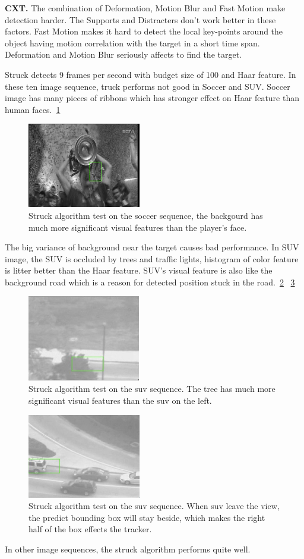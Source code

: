 \documentclass{acm_proc_article-sp}
\begin{document}
\textbf{CXT.} The combination of Deformation, Motion Blur and Fast Motion make detection harder. The Supports and Distracters don't work better in these factors. Fast Motion makes it hard to detect the local key-points around the object having motion correlation with the target in a short time span. Deformation and Motion Blur seriously affects to find the target.

Struck detects 9 frames per second with budget size of 100 and Haar feature.
In these ten image sequence, truck performs not good in Soccer and SUV.
Soccer image has many pieces of ribbons which has stronger effect on Haar feature than human faces.~\ref{fig:struck_soccer}
\begin{figure}[hbt]
    \includegraphics[width=140pt]{struck_soccer}
    \caption{Struck algorithm test on the soccer sequence, the backgourd has much more significant visual features than the player's face.}
    \label{fig:struck_soccer}
\end{figure}
The big variance of background near the target causes bad performance.
In SUV image, the SUV is occluded by trees and traffic lights, histogram of color feature is litter better than the Haar feature.
SUV's visual feature is also like the background road which is a reason for detected position stuck in the road.~\ref{fig:struck_suv} ~\ref{fig:struck_suv_out_of_view}
\begin{figure}[hbt]
    \includegraphics[width=140pt]{struck_suv}
    \caption{Struck algorithm test on the suv sequence. The tree has much more significant visual features than the suv on the left.}
    \label{fig:struck_suv}
\end{figure}
\begin{figure}[hbt]
    \includegraphics[width=140pt]{struck_suv_out_of_view}
    \caption{Struck algorithm test on the suv sequence. When suv leave the view, the predict bounding box will stay beside, which makes the right half of the box effects the tracker.}
    \label{fig:struck_suv_out_of_view}
\end{figure}
In other image sequences, the struck algorithm performs quite well.
\end{document}
